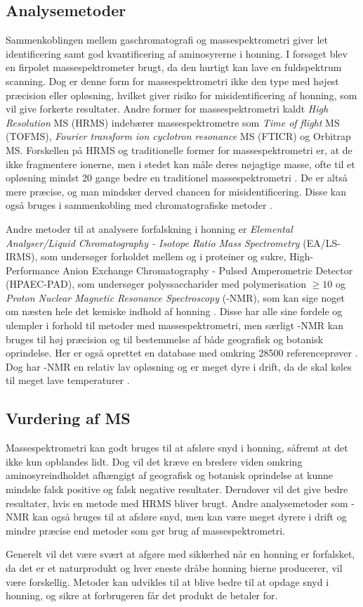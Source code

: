 \subsection{Analysemetoder}
Sammenkoblingen mellem gaschromatografi og massespektrometri giver let identificering samt god kvantificering af aminosyrerne i honning.
I forsøget blev en firpolet massespektrometer brugt, da den hurtigt kan lave en fuldspektrum scanning.
Dog er denne form for massespektrometri ikke den type med højest præcision eller opløsning, hvilket giver risiko for misidentificering af honning, som vil give forkerte resultater.
Andre former for massespektrometri kaldt \emph{High Resolution} MS (HRMS) indebærer massespektrometre som \emph{Time of flight} MS (TOFMS), \emph{Fourier transform ion cyclotron resonance} MS (FTICR) og Orbitrap MS.
Forskellen på HRMS og traditionelle former for massespektrometri er, at de ikke fragmentere ionerne, men i stedet kan måle deres nøjagtige masse, ofte til et opløsning mindst \num{20} gange bedre en traditionel massespektrometri \parencite{tandemMS}.
De er altså mere præcise, og man mindsker derved chancen for misidentificering. Disse kan også bruges i sammenkobling med chromatografiske metoder \parencite{mstextbook}.
\par Andre metoder til at analysere forfalskning i honning er \emph{Elemental Analyser/Liquid Chromatography - Isotope Ratio Mass Spectrometry} (EA/LS-IRMS),
som undersøger forholdet mellem  og  i proteiner og sukre, High-Performance Anion Exchange Chromatography - Pulsed Amperometric Detector (HPAEC-PAD),
som undersøger polyssaccharider med polymerisation $\geq 10$ og \emph{Proton Nuclear Magnetic Resonance Spectroscopy} (-NMR), som kan sige noget om næsten hele det kemiske indhold af honning \parencite{EUhoney}.
Disse har alle sine fordele og ulempler i forhold til metoder med massespektrometri, men særligt -NMR kan bruges til høj præcision og til bestemmelse af både geografisk og botanisk oprindelse.
Her er også oprettet en database med omkring \num{28500} referenceprøver \parencite{HNMRbruker}.
Dog har -NMR en relativ lav opløsning og er meget dyre i drift, da de skal køles til meget lave temperaturer \parencite{advHNMR}.
\subsection{Vurdering af MS}
Massespektrometri kan godt bruges til at afsløre snyd i honning, såfremt at det ikke kun opblandes lidt.
Dog vil det kræve en bredere viden omkring aminosyreindholdet afhængigt af geografisk og botanisk oprindelse at kunne mindske falsk positive og falsk negative resultater.
Derudover vil det give bedre resultater, hvis en metode med HRMS bliver brugt.
Andre analysemetoder som -NMR kan også bruges til at afsløre snyd, men kan være meget dyrere i drift og mindre præcise end metoder som gør brug af massespektrometri.
\par Generelt vil det være svært at afgøre med sikkerhed når en honning er forfalsket, da det er et naturprodukt og hver eneste dråbe honning bierne producerer, vil være forskellig.
Metoder kan udvikles til at blive bedre til at opdage snyd i honning, og sikre at forbrugeren får det produkt de betaler for.
